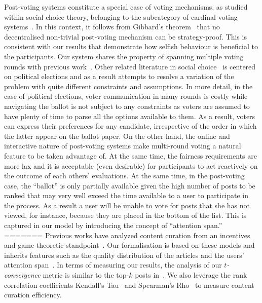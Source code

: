 Post-voting systems constitute a special case of voting mechanisms, as studied within social choice theory, belonging to the subcategory of cardinal voting systems~\cite{hillinger2005case}. In this context, it follows from Gibbard's theorem~\cite{gibbard1973manipulation} that no decentralised non-trivial 
post-voting mechanism can be strategy-proof. This is consistent with our results that 
demonstrate how selfish behaviour is beneficial to the participants. Our system shares the property of spanning multiple voting rounds with previous work~\cite{kalech2011practical}. Other related literature in social choice~\cite{lu2011robust,conitzer2005communication,xia2010compilation} is centered on political elections and as a result attempts to resolve a variation of the problem with quite different constraints and assumptions. In more detail, in the case of political elections, voter communication in many rounds is costly while navigating the ballot  is not subject to any constraints as voters are assumed to have plenty of time to parse all the options available to them. As a result, voters can express their preferences for any candidate, irrespective of the order in which the latter appear on the ballot paper. On the other hand, the online and interactive nature of post-voting systems make multi-round voting a natural feature to be taken advantage of. At the same time, the fairness requirements are more lax and it is acceptable (even desirable) for participants to act reactively on the outcome of each others' evaluations.  At the same time, in the post-voting case, the ``ballot'' is only partially available given the high number of posts to be ranked that may very well exceed the time available to a user to participate in the process. As a result a user will be  unable to vote for posts that she has not viewed, for instance,  because they are placed in the bottom of the list. This is captured in our  model by introducing the concept of ``attention span.''
=======
Previous works have analyzed content curation from an incentives and game-theoretic standpoint~\cite{ghosh2011incentivizing,das2010ranking,gupte2009news,may2014filter,abbassi2014distributed}. Our formalisation is based on these models and inherits features such as the quality distribution of the articles and the users' attention span~\cite{askalidis2013theoretical,ghosh2011incentivizing}. In terms of measuring our results, the analysis of our \textit{$t$-convergence} metric is similar to the top-$k$ posts in~\cite{askalidis2013theoretical}. We also leverage the rank correlation coefficients Kendall's Tau~\cite{kendall1955rank} and Spearman's Rho~\cite{spearman1904proof} to measure content curation efficiency.
